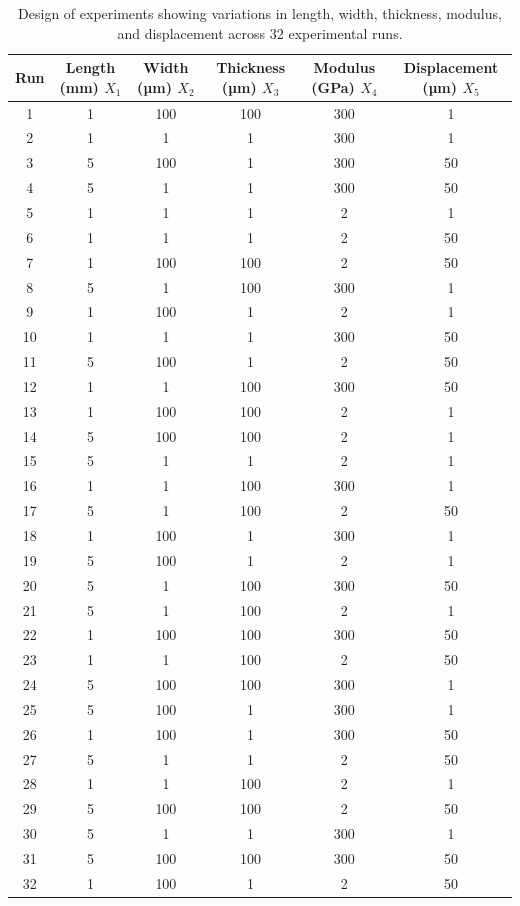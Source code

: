 \documentclass[fleqn,10pt]{wlscirep}
\begin{document}
\begin{table}[h!]
\centering
\caption{Design of experiments showing variations in length, width, thickness, modulus, and displacement across 32 experimental runs.}
\label{Table 1}
\begin{tabular}{c c c c c c}
\hline
Run & Length (mm) $X_{1}$ & Width (µm) $X_{2}$ & Thickness (µm) $X_{3}$ & Modulus (GPa) $X_{4}$ & Displacement (µm) $X_{5}$ \\
\hline
1  & 1 & 100 & 100 & 300 & 1 \\
2  & 1 & 1   & 1   & 300 & 1 \\
3  & 5 & 100 & 1   & 300 & 50 \\
4  & 5 & 1   & 1   & 300 & 50 \\
5  & 1 & 1   & 1   & 2   & 1 \\
6  & 1 & 1   & 1   & 2   & 50 \\
7  & 1 & 100 & 100 & 2   & 50 \\
8  & 5 & 1   & 100 & 300 & 1 \\
9  & 1 & 100 & 1   & 2   & 1 \\
10 & 1 & 1   & 1   & 300 & 50 \\
11 & 5 & 100 & 1   & 2   & 50 \\
12 & 1 & 1   & 100 & 300 & 50 \\
13 & 1 & 100 & 100 & 2   & 1 \\
14 & 5 & 100 & 100 & 2   & 1 \\
15 & 5 & 1   & 1   & 2   & 1 \\
16 & 1 & 1   & 100 & 300 & 1 \\
17 & 5 & 1   & 100 & 2   & 50 \\
18 & 1 & 100 & 1   & 300 & 1 \\
19 & 5 & 100 & 1   & 2   & 1 \\
20 & 5 & 1   & 100 & 300 & 50 \\
21 & 5 & 1   & 100 & 2   & 1 \\
22 & 1 & 100 & 100 & 300 & 50 \\
23 & 1 & 1   & 100 & 2   & 50 \\
24 & 5 & 100 & 100 & 300 & 1 \\
25 & 5 & 100 & 1   & 300 & 1 \\
26 & 1 & 100 & 1   & 300 & 50 \\
27 & 5 & 1   & 1   & 2   & 50 \\
28 & 1 & 1   & 100 & 2   & 1 \\
29 & 5 & 100 & 100 & 2   & 50 \\
30 & 5 & 1   & 1   & 300 & 1 \\
31 & 5 & 100 & 100 & 300 & 50 \\
32 & 1 & 100 & 1   & 2   & 50 \\
\hline
\end{tabular}
\end{table}
\end{document}
